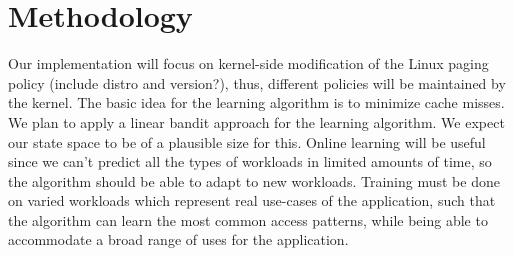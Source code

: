 \section{Methodology}

Our implementation will focus on kernel-side modification of the Linux paging policy (include distro and version?), thus, different policies will be maintained by the kernel. The basic idea for the learning algorithm is to minimize cache misses. We plan to apply a linear bandit approach for the learning algorithm. We expect our state space to be of a plausible size for this. Online learning will be useful since we can't predict all the types of workloads in limited amounts of time, so the algorithm should be able to adapt to new workloads. Training must be done on varied workloads which represent real use-cases of the application, such that the algorithm can learn the most common access patterns, while being able to accommodate a broad range of uses for the application. 
